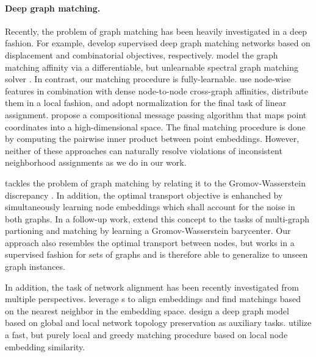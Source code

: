 \documentclass{article}
\begin{document}
\paragraph{Deep graph matching.}

Recently, the problem of graph matching has been heavily investigated in a deep fashion.
For example, \citet{Zanfir/Sminchisescu/2018,Wang/etal/2019,Zhang/Lee/2019} develop supervised deep graph matching networks based on displacement and combinatorial objectives, respectively.
\citet{Zanfir/Sminchisescu/2018} model the graph matching affinity via a differentiable, but unlearnable spectral graph matching solver \citep{Leordeanu/Hebert/2005}.
In contrast, our matching procedure is fully-learnable.
\citet{Wang/etal/2019} use node-wise features in combination with dense node-to-node cross-graph affinities, distribute them in a local fashion, and adopt  normalization for the final task of linear assignment.
\citet{Zhang/Lee/2019} propose a compositional message passing algorithm that maps point coordinates into a high-dimensional space.
The final matching procedure is done by computing the pairwise inner product between point embeddings.
However, neither of these approaches can naturally resolve violations of inconsistent neighborhood assignments as we do in our work.

\citet{Xu/etal/2019c} tackles the problem of graph matching by relating it to the Gromov-Wasserstein discrepancy \citep{Peyre/etal/2016}.
In addition, the optimal transport objective is enhanched by simultaneously learning node embeddings which shall account for the noise in both graphs.
In a follow-up work, \citet{Xu/etal/2019d} extend this concept to the tasks of multi-graph partioning and matching by learning a Gromov-Wasserstein barycenter.
Our approach also resembles the optimal transport between nodes, but works in a supervised fashion for sets of graphs and is therefore able to generalize to unseen graph instances.

In addition, the task of network alignment has been recently investigated from multiple perspectives.
\citet{Derr/etal/2019} leverage s \citep{Zhu/etal/2017} to align  embeddings \citep{Grover/Leskovec/2016} and find matchings based on the nearest neighbor in the embedding space.
\citet{Zhang/etal/2019a} design a deep graph model based on global and local network topology preservation as auxiliary tasks.
\citet{Heimann/etal/2018} utilize a fast, but purely local and greedy matching procedure based on local node embedding similarity.
\end{document}

